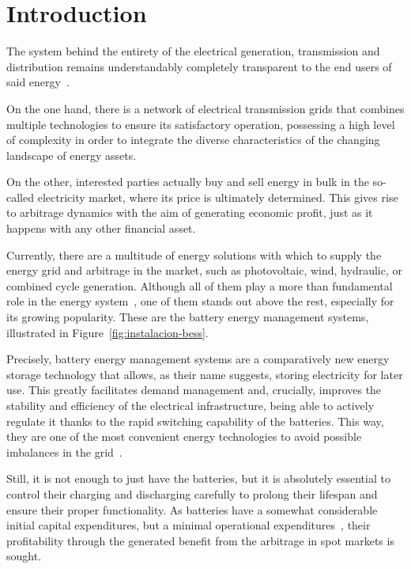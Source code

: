 \cleardoublepage%

\chapter*{Introduction}%
\label{makereference9}

The system behind the entirety of the electrical generation, transmission and distribution remains understandably completely transparent to the end users of said energy~\cite{garrues2009red}.

On the one hand, there is a network of electrical transmission grids that combines multiple technologies to ensure its satisfactory operation, possessing a high level of complexity in order to integrate the diverse characteristics of the changing landscape of energy assets.

On the other, interested parties actually buy and sell energy in bulk in the so-called electricity market, where its price is ultimately determined. This gives rise to arbitrage dynamics with the aim of generating economic profit, just as it happens with any other financial asset.

Currently, there are a multitude of energy solutions with which to supply the energy grid and arbitrage in the market, such as photovoltaic, wind, hydraulic, or combined cycle generation. Although all of them play a more than fundamental role in the energy system~\cite{turkenburg2000renewable}, one of them stands out above the rest, especially for its growing popularity. These are the battery energy management systems, illustrated in Figure~\ref{fig:instalacion-bess}.

Precisely, battery energy management systems are a comparatively new energy storage technology that allows, as their name suggests, storing electricity for later use. This greatly facilitates demand management and, crucially, improves the stability and efficiency of the electrical infrastructure, being able to actively regulate it thanks to the rapid switching capability of the batteries. This way, they are one of the most convenient energy technologies to avoid possible imbalances in the grid~\cite{xu2014bess}.

Still, it is not enough to just have the batteries, but it is absolutely essential to control their charging and discharging carefully to prolong their lifespan and ensure their proper functionality. As batteries have a somewhat considerable initial capital expenditures, but a minimal operational expenditures~\cite{larsson2018cost}, their profitability through the generated benefit from the arbitrage in spot markets is sought.

